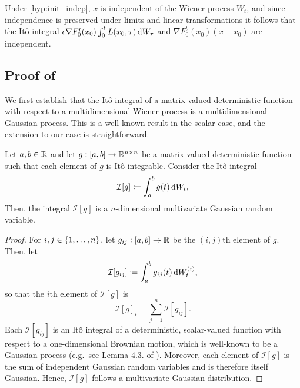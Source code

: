 Under \ref{hyp:init_indep}, \(x\) is independent of the Wiener process \(W_t\), and since independence is preserved under limits and linear transformations it follows that the It\^o integral \(\epsilon \nabla F_0^t\!\left(x_0\right)\int_0^t{L\!\left(x_0, \tau\right)\dif W_\tau}\) and \(\nabla F_0^t\!\left(x_0\right)\left(x - x_0\right)\) are independent.


\subsection{Proof of }\label{app:limit_moments_proof}
We first establish that the It\^o integral of a matrix-valued deterministic function with respect to a multidimensional Wiener process is a multidimensional Gaussian process.
This is a well-known result in the scalar case, and the extension to our case is straightforward.
\begin{lemma}\label{lem:det_gauss}
	Let \(a,b \in \mathbb{R}\) and let \(g: [a,b] \to \mathbb{R}^{n\times n}\) be a matrix-valued deterministic function such that each element of \(g\) is It\^o-integrable.
	Consider the It\^o integral
	\[
		\mathcal{I}[g] \coloneqq \int_{a}^b{g(t)\dif W_t},
	\]
	Then, the integral \(\mathcal{I}[g]\) is a \(n\)-dimensional multivariate Gaussian random variable.
\end{lemma}
\begin{proof}
	For \(i,j \in \set{1,\hdots,n}\), let \(g_{ij}: [a,b] \to \mathbb{R}\) be the \((i,j)\)th element of \(g\).
	Then, let
	\[
		\mathcal{I}[g_{ij}] \coloneqq \int_a^b{g_{ij}(t)\dif W_t^{(i)}},
	\]
	so that the \(i\)th element of \(\mathcal{I}[g]\) is
	\[
		\mathcal{I}[g]_i = \sum_{j = 1}^n{\mathcal{I}\left[g_{ij}\right]}.
	\]
	Each \(\mathcal{I}[g_{ij}]\) is an It\^o integral of a deterministic, scalar-valued function with respect to a one-dimensional Brownian motion, which is well-known to be a Gaussian process (e.g.\ see Lemma 4.3. of \citet{Applebaum_2004_LevyProcessesStochastic}).
	Moreover, each element of \(\mathcal{I}[g]\) is the sum of independent Gaussian random variables and is therefore itself Gaussian.
	Hence, \(\mathcal{I}[g]\) follows a multivariate Gaussian distribution.
\end{proof}

